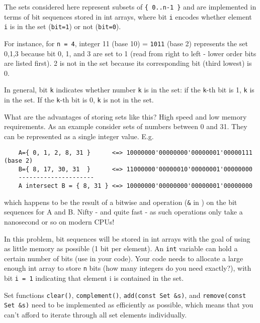 \documentclass[a4paper,11pt]{article}
\begin{document}
\medskip

The sets considered here represent subsets of \texttt{\{ 0..n-1 \}} and are implemented
in terms of bit sequences stored in int arrays, where bit \texttt{i} encodes whether
element \texttt{i} is in the set (\texttt{bit=1}) or not (\texttt{bit=0}).

\medskip 

For instance, for \texttt{n = 4}, integer 11 (base 10) = \texttt{1011} (base 2) represents the
set {0,1,3} because bit 0, 1, and 3 are set to 1 (read from right to left - lower
order bits are listed first). 2 is not in the set because its corresponding
bit (third lowest) is 0.

\medskip 

In general, bit \texttt{k} indicates whether number \texttt{k} is in the set: if the \texttt{k}-th bit is
1, \texttt{k} is in the set. If the \texttt{k}-th bit is 0, \texttt{k} is not in the set.

\medskip

What are the advantages of storing sets like this? High speed and low memory
requirements. As an example consider sets of numbers between 0 and 31. They
can be represented as a single integer value. E.g.

\begin{verbatim}
    A={ 0, 1, 2, 8, 31 }      <=> 10000000'00000000'00000001'00000111 (base 2)
    B={ 8, 17, 30, 31  }      <=> 11000000'00000010'00000001'00000000 
    ---------------------
    A intersect B = { 8, 31 } <=> 10000000'00000000'00000001'00000000
\end{verbatim}

which happens to be the result of a bitwise and operation (\texttt{\&} in {\CC}) on the
bit sequences for A and B. Nifty - and quite fast - as such operations only
take a nanosecond or so on modern CPUs!

\medskip

In this problem, bit sequences will be stored in int arrays with the goal of
using as little memory as possible (1 bit per element).
An \texttt{int} variable can hold a certain number of bits (use  in your code). Your code needs to allocate a large
enough int array to store \texttt{n} bits (how many integers do you need exactly?),
with bit \texttt{i = 1} indicating that element i is contained in the set.

\medskip 

Set functions \texttt{clear()}, \texttt{complement()}, \texttt{add(const Set \&s)}, and \texttt{remove(const Set
\&s)} need to be implemented as efficiently as possible, which means that you
can't afford to iterate through all set elements individually. 
\end{document}
